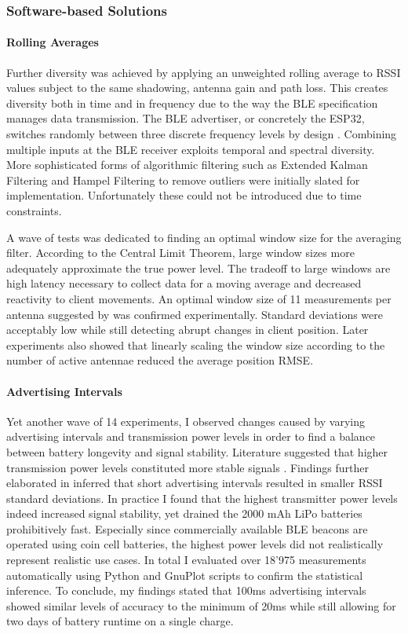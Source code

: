 \documentclass[a4paper, oneside]{ipsreport}
\begin{document}
\subsubsection{Software-based Solutions}
\paragraph{Rolling Averages}
Further diversity was achieved by applying an unweighted rolling average to RSSI values subject to the same shadowing, antenna gain and path loss. This creates diversity both in time and in frequency due to the way the BLE specification manages data transmission. The BLE advertiser, or concretely the ESP32, switches randomly between three discrete frequency levels by design \cite{Esp32GAP}. Combining multiple inputs at the BLE receiver exploits temporal and spectral diversity. More sophisticated forms of algorithmic filtering such as Extended Kalman Filtering and Hampel Filtering to remove outliers were initially slated for implementation. Unfortunately these could not be introduced due to time constraints.

A wave of tests was dedicated to finding an optimal window size for the averaging filter. According to the Central Limit Theorem, large window sizes more adequately approximate the true power level. The tradeoff to large windows are high latency necessary to collect data for a moving average and decreased reactivity to client movements. An optimal window size of 11 measurements per antenna suggested by \cite{BayesianFiltering} was confirmed experimentally. Standard deviations were acceptably low while still detecting abrupt changes in client position. Later experiments also showed that linearly scaling the window size according to the number of active antennae reduced the average position RMSE.

\paragraph{Advertising Intervals}
Yet another wave of 14 experiments, I observed changes caused by varying advertising intervals and transmission power levels in order to find a balance between battery longevity and signal stability. Literature suggested that higher transmission power levels constituted more stable signals \cite{AdvertisingIntervalBestPractices}. Findings further elaborated in \cite{AdvertisingInterval} inferred that short advertising intervals resulted in smaller RSSI standard deviations. In practice I found that the highest transmitter power levels indeed increased signal stability, yet drained the 2000 mAh LiPo batteries prohibitively fast. Especially since commercially available BLE beacons are operated using coin cell batteries, the highest power levels did not realistically represent realistic use cases. In total I evaluated  over 18'975 measurements automatically using Python and GnuPlot scripts to confirm the statistical inference. To conclude, my findings stated that 100ms advertising intervals showed similar levels of accuracy to the minimum of 20ms while still allowing for two days of battery runtime on a single charge.
\end{document}
